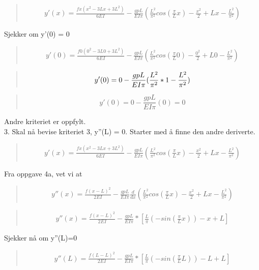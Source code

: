 \begin{quote}
\begin{multline*}
y'(x) = \frac{fx(x^2-3Lx+3L^2)}{6EI} - \frac{gpL}{EI\pi} (\frac{L^2}{\pi^2} cos(\frac{\pi}{L}x) - \frac{x^2}{2} + Lx - \frac{L^2}{\pi^2})
\end{multline*}
\end{quote}
Sjekker om y'(0) = 0
\begin{quote}
\begin{multline*}
y'(0) = \frac{f0(0^2-3L0+3L^2)}{6EI} - \frac{gpL}{EI\pi} (\frac{L^2}{\pi^2} cos(\frac{\pi}{L}0) - \frac{0^2}{2} + L0 - \frac{L^2}{\pi^2})
\end{multline*}
\end{quote}

\begin{quote}
\begin{equation*}
y'(0) = 0 - \frac{gpL}{EI\pi} (\frac{L^2}{\pi^2} * 1 -\frac{L^2}{\pi^2}) \\
\end{equation*}
\end{quote}

\begin{quote}
\begin{equation*}
y'(0) = 0 - \frac{gpL}{EI\pi} (0) = 0
\end{equation*}
\end{quote}
Andre kriteriet er oppfylt.
\\
3. Skal nå bevise kriteriet 3, y''(L) = 0. Starter med å finne den andre deriverte.
\begin{quote}
\begin{multline*}
y'(x) = \frac{fx(x^2-3Lx+3L^2)}{6EI} - \frac{gpL}{EI\pi} (\frac{L^2}{\pi^2} cos(\frac{\pi}{L}x) - \frac{x^2}{2} + Lx - \frac{L^2}{\pi^2})
\end{multline*}
\end{quote}
Fra oppgave 4a, vet vi at
\begin{quote}
\begin{multline*}
y''(x) = \frac{f(x-L)^2}{2EI} - \frac{gpL}{EI\pi} \frac{d}{dx}(\frac{L^2}{\pi^2} cos(\frac{\pi}{L}x) - \frac{x^2}{2} + Lx - \frac{L^2}{\pi^2})
\end{multline*}
\end{quote}

\begin{quote}
\begin{multline}
y''(x) = \frac{f(x-L)^2}{2EI} - \frac{gpL}{EI\pi}* [\frac{L}{\pi} (-sin(\frac{\pi}{L}x)) - x + L]
\end{multline}
\end{quote}
Sjekker nå om y''(L)=0
\begin{quote}
\begin{multline}
y''(L) = \frac{f(L-L)^2}{2EI} - \frac{gpL}{EI\pi}* [\frac{L}{\pi} (-sin(\frac{\pi}{L}L)) - L + L]
\end{multline}
\end{quote}

